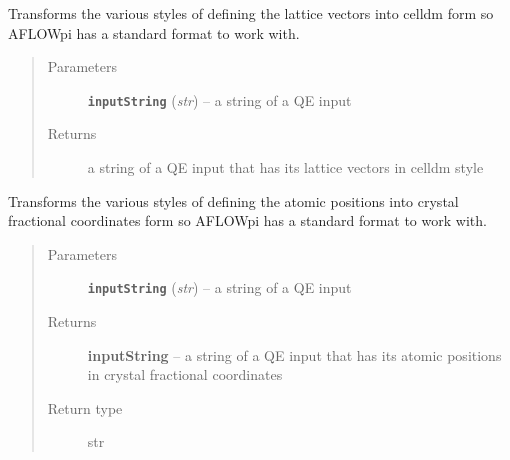 \documentclass[letterpaper,10pt,english]{sphinxmanual}
\begin{document}

\begin{fulllineitems}
\label{prep:prep.__transformParamsInput}
Transforms the various styles of defining the lattice vectors into celldm form so AFLOWpi
has a standard format to work with.
\begin{quote}\begin{description}
\item[{Parameters}] \leavevmode
\textbf{\texttt{inputString}} (\emph{str}) -- a string of a QE input

\item[{Returns}] \leavevmode
a string of a QE input that has its lattice vectors in celldm style

\end{description}\end{quote}

\end{fulllineitems}


\begin{fulllineitems}
\label{prep:prep.__transformPositionsInput}
Transforms the various styles of defining the atomic positions into crystal
fractional coordinates form so AFLOWpi has a standard format to work with.
\begin{quote}\begin{description}
\item[{Parameters}] \leavevmode
\textbf{\texttt{inputString}} (\emph{str}) -- a string of a QE input

\item[{Returns}] \leavevmode
\textbf{inputString} --
a string of a QE input that has its atomic positions in crystal fractional coordinates

\item[{Return type}] \leavevmode
str

\end{description}\end{quote}

\end{fulllineitems}

\end{document}

